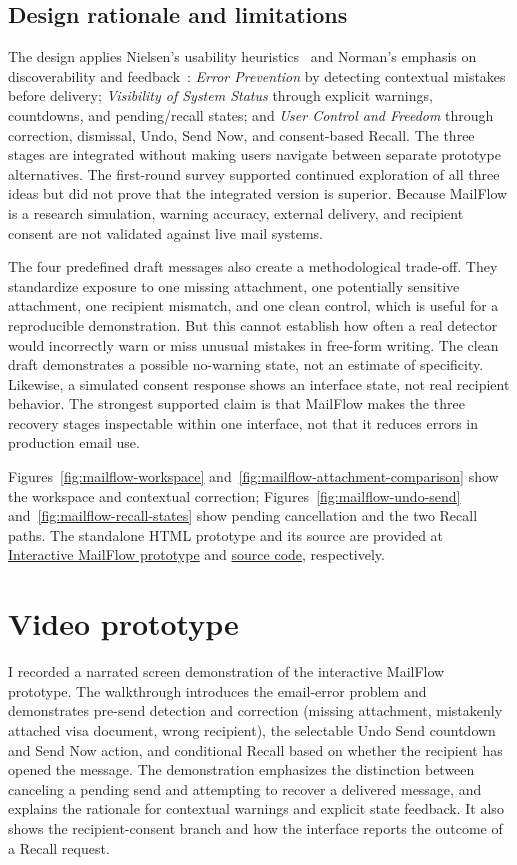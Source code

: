 \documentclass[letterpaper]{jdf}
\begin{document}
\subsection{Design rationale and limitations}
The design applies Nielsen's usability heuristics~\citep{nielsen-heuristics} and Norman's emphasis on discoverability and feedback~\citep{norman-2013}: \emph{Error Prevention} by detecting contextual mistakes before delivery; \emph{Visibility of System Status} through explicit warnings, countdowns, and pending/recall states; and \emph{User Control and Freedom} through correction, dismissal, Undo, Send Now, and consent-based Recall. The three stages are integrated without making users navigate between separate prototype alternatives. The first-round survey supported continued exploration of all three ideas but did not prove that the integrated version is superior. Because MailFlow is a research simulation, warning accuracy, external delivery, and recipient consent are not validated against live mail systems.

The four predefined draft messages also create a methodological trade-off. They standardize exposure to one missing attachment, one potentially sensitive attachment, one recipient mismatch, and one clean control, which is useful for a reproducible demonstration. But this cannot establish how often a real detector would incorrectly warn or miss unusual mistakes in free-form writing. The clean draft demonstrates a possible no-warning state, not an estimate of specificity. Likewise, a simulated consent response shows an interface state, not real recipient behavior. The strongest supported claim is that MailFlow makes the three recovery stages inspectable within one interface, not that it reduces errors in production email use.

Figures~\ref{fig:mailflow-workspace} and~\ref{fig:mailflow-attachment-comparison} show the workspace and contextual correction; Figures~\ref{fig:mailflow-undo-send} and~\ref{fig:mailflow-recall-states} show pending cancellation and the two Recall paths. The standalone HTML prototype and its source are provided at \href{https://zihanzheng2000.github.io/mailflow_prototype/}{Interactive MailFlow prototype} and \href{https://github.com/ZihanZheng2000/mailflow_prototype}{source code}, respectively.

\section{Video prototype}
I recorded a narrated screen demonstration of the interactive MailFlow prototype. The walkthrough introduces the email-error problem and demonstrates pre-send detection and correction (missing attachment, mistakenly attached visa document, wrong recipient), the selectable Undo Send countdown and Send Now action, and conditional Recall based on whether the recipient has opened the message. The demonstration emphasizes the distinction between canceling a pending send and attempting to recover a delivered message, and explains the rationale for contextual warnings and explicit state feedback. It also shows the recipient-consent branch and how the interface reports the outcome of a Recall request.
\end{document}
